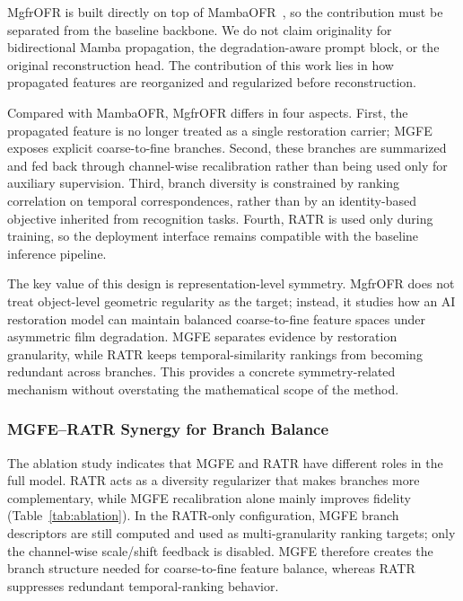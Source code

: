 \documentclass[symmetry,article,submit,pdftex,moreauthors]{Definitions/mdpi}
\begin{document}
MgfrOFR is built directly on top of MambaOFR~\cite{mao2025mambaofr}, so the contribution must be separated from the baseline backbone. We do not claim originality for bidirectional Mamba propagation, the degradation-aware prompt block, or the original reconstruction head. The contribution of this work lies in how propagated features are reorganized and regularized before reconstruction.

Compared with MambaOFR, MgfrOFR differs in four aspects. First, the propagated feature is no longer treated as a single restoration carrier; MGFE exposes explicit coarse-to-fine branches. Second, these branches are summarized and fed back through channel-wise recalibration rather than being used only for auxiliary supervision. Third, branch diversity is constrained by ranking correlation on temporal correspondences, rather than by an identity-based objective inherited from recognition tasks. Fourth, RATR is used only during training, so the deployment interface remains compatible with the baseline inference pipeline.

The key value of this design is representation-level symmetry. MgfrOFR does not treat object-level geometric regularity as the target; instead, it studies how an AI restoration model can maintain balanced coarse-to-fine feature spaces under asymmetric film degradation. MGFE separates evidence by restoration granularity, while RATR keeps temporal-similarity rankings from becoming redundant across branches. This provides a concrete symmetry-related mechanism without overstating the mathematical scope of the method.

\subsubsection{MGFE--RATR Synergy for Branch Balance}
\label{subsec:synergy}

The ablation study indicates that MGFE and RATR have different roles in the full model. RATR acts as a diversity regularizer that makes branches more complementary, while MGFE recalibration alone mainly improves fidelity (Table~\ref{tab:ablation}). In the RATR-only configuration, MGFE branch descriptors are still computed and used as multi-granularity ranking targets; only the channel-wise scale/shift feedback is disabled. MGFE therefore creates the branch structure needed for coarse-to-fine feature balance, whereas RATR suppresses redundant temporal-ranking behavior.
\end{document}
